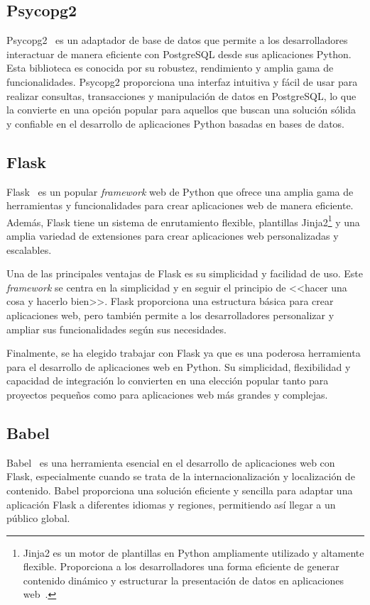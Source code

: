 \subsection{Psycopg2}
 Psycopg2~\cite{psycopg2} es un adaptador de base de datos que permite a los desarrolladores interactuar de manera eficiente con PostgreSQL desde sus aplicaciones Python. Esta biblioteca es conocida por su robustez, rendimiento y amplia gama de funcionalidades. Psycopg2 proporciona una interfaz intuitiva y fácil de usar para realizar consultas, transacciones y manipulación de datos en PostgreSQL, lo que la convierte en una opción popular para aquellos que buscan una solución sólida y confiable en el desarrollo de aplicaciones Python basadas en bases de datos.

\subsection{Flask}
Flask~\cite{flask} es un popular \textit{framework} web de Python que ofrece una amplia gama de herramientas y funcionalidades para crear aplicaciones web de manera eficiente. Además, Flask tiene un sistema de enrutamiento flexible, plantillas Jinja2\footnote{Jinja2 es un motor de plantillas en Python ampliamente utilizado y altamente flexible. Proporciona a los desarrolladores una forma eficiente de generar contenido dinámico y estructurar la presentación de datos en aplicaciones web~\cite{jinja2}.} y una amplia variedad de extensiones para crear aplicaciones web personalizadas y escalables.

Una de las principales ventajas de Flask es su simplicidad y facilidad de uso. Este \textit{framework} se centra en la simplicidad y en seguir el principio de <<hacer una cosa y hacerlo bien>>. Flask proporciona una estructura básica para crear aplicaciones web, pero también permite a los desarrolladores personalizar y ampliar sus funcionalidades según sus necesidades.

Finalmente, se ha elegido trabajar con Flask ya que es una poderosa herramienta para el desarrollo de aplicaciones web en Python. Su simplicidad, flexibilidad y capacidad de integración lo convierten en una elección popular tanto para proyectos pequeños como para aplicaciones web más grandes y complejas.

\subsection{Babel}
Babel~\cite{babel} es una herramienta esencial en el desarrollo de aplicaciones web con Flask, especialmente cuando se trata de la internacionalización y localización de contenido. Babel proporciona una solución eficiente y sencilla para adaptar una aplicación Flask a diferentes idiomas y regiones, permitiendo así llegar a un público global.

